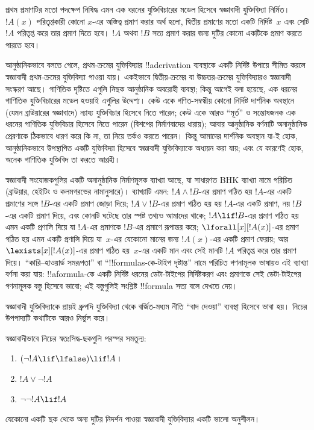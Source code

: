 \documentclass[../../../include/open-logic-section]{subfiles}
\begin{document}
প্রথম প্রমাণটির মতো পদক্ষেপ নিষিদ্ধ এমন এক ধরনের যুক্তিবিচারের মডেল
হিসেবে স্বজ্ঞাবাদী যুক্তিবিদ্যা নির্মিত। $!A(x)$ পরিতৃপ্তকারী কোনো
$x$-এর অস্তিত্ব প্রমাণ করার অর্থ হলো, দ্বিতীয় প্রমাণের মতো একটি
নির্দিষ্ট~$x$ এবং সেটি $!A$ পরিতৃপ্ত করে তার প্রমাণ দিতে হবে। $!A$
অথবা $!B$ সত্য প্রমাণ করার জন্য দুটির কোনো একটিকে প্রমাণ করতে পারতে
হবে।

আনুষ্ঠানিকভাবে বলতে গেলে, প্রথম-ক্রমের যুক্তিবিদ্যার !!a{derivation}
ব্যবস্থাকে একটি নির্দিষ্ট উপায়ে সীমিত করলে স্বজ্ঞাবাদী প্রথম-ক্রমের
যুক্তিবিদ্যা পাওয়া যায়। একইভাবে দ্বিতীয়-ক্রমের বা উচ্চতর-ক্রমের
যুক্তিবিদ্যারও স্বজ্ঞাবাদী সংস্করণ আছে। গাণিতিক দৃষ্টিতে এগুলি নিছক
আনুষ্ঠানিক অবরোহী ব্যবস্থা; কিন্তু আগেই বলা হয়েছে, এক ধরনের গাণিতিক
যুক্তিবিচারের মডেল হওয়াই এগুলির উদ্দেশ্য। কেউ একে গণিত-সম্বন্ধীয়
কোনো নির্দিষ্ট দার্শনিক অবস্থানে (যেমন ব্রাউয়ারের স্বজ্ঞাবাদে) ন্যায্য
যুক্তিবিচার হিসেবে নিতে পারেন; কেউ একে আরও “মূর্ত” ও সন্তোষজনক এক
ধরনের গাণিতিক যুক্তিবিচার হিসেবে নিতে পারেন (বিশপের নির্মাণবাদের
ধারায়); আবার আনুষ্ঠানিক বর্ণনাটি অনানুষ্ঠানিক প্রেরণাকে ঠিকভাবে ধারণ
করে কি না, তা নিয়ে তর্কও করতে পারেন। কিন্তু আমাদের দার্শনিক অবস্থান
যা-ই হোক, আনুষ্ঠানিকভাবে উপস্থাপিত একটি যুক্তিবিদ্যা হিসেবে
স্বজ্ঞাবাদী যুক্তিবিদ্যাকে অধ্যয়ন করা যায়; এবং যে কারণেই হোক, অনেক
গাণিতিক যুক্তিবিদ তা করতে আগ্রহী।

স্বজ্ঞাবাদী সংযোজকগুলির একটি অনানুষ্ঠানিক নির্মাণমূলক ব্যাখ্যা আছে,
যা সাধারণত BHK ব্যাখ্যা নামে পরিচিত (ব্রাউয়ার, হেইটিং ও কলমগরভের
নামানুসারে)। ব্যাখ্যাটি এমন: $!A \land !B$-এর প্রমাণ গঠিত হয় $!A$-এর
একটি প্রমাণের সঙ্গে $!B$-এর একটি প্রমাণ জোড়া দিয়ে; $!A \lor !B$-এর
প্রমাণ গঠিত হয় হয় $!A$-এর একটি প্রমাণ, নয় $!B$-এর একটি প্রমাণ দিয়ে,
এবং কোনটি ঘটেছে তার স্পষ্ট তথ্যও আমাদের থাকে; $!A \lif !B$-এর প্রমাণ
গঠিত হয় এমন একটি প্রণালি দিয়ে যা $!A$-এর প্রমাণকে $!B$-এর প্রমাণে
রূপান্তর করে; $\lforall[x][!A(x)]$-এর প্রমাণ গঠিত হয় এমন একটি প্রণালি
দিয়ে যা~$x$-এর যেকোনো মানের জন্য $!A(x)$-এর একটি প্রমাণ ফেরায়; আর
$\lexists[x][!A(x)]$-এর প্রমাণ গঠিত হয়~$x$-এর একটি মান এবং সেই মানটি
$!A$ পরিতৃপ্ত করে তার প্রমাণ দিয়ে। “কারি--হাওয়ার্ড সমরূপতা” বা
“!!{formula}s-কে-টাইপ দৃষ্টান্ত” নামে পরিচিত গণনামূলক ভাষায়ও এই
ব্যাখ্যা বর্ণনা করা যায়: !!a{formula}-কে একটি নির্দিষ্ট ধরনের
ডেটা-টাইপের নির্দিষ্টকরণ এবং প্রমাণকে সেই ডেটা-টাইপের গণনামূলক বস্তু
হিসেবে ভাবো; এই বস্তুগুলিই সংশ্লিষ্ট !!{formula} সত্য বলে দেখতে দেয়।

স্বজ্ঞাবাদী যুক্তিবিদ্যাকে প্রায়ই ধ্রুপদি যুক্তিবিদ্যা থেকে
বর্জিত-মধ্যম নীতি “বাদ দেওয়া” ব্যবস্থা হিসেবে ভাবা হয়। নিচের
উপপাদ্যটি কথাটিকে আরও নির্ভুল করে।
\begin{thm}
স্বজ্ঞাবাদীভাবে নিচের স্বতঃসিদ্ধ-ছকগুলি পরস্পর সমতুল্য:
\begin{enumerate}
\item $(\lnot !A \lif \lfalse) \lif !A$।
\item $!A \lor \lnot !A$
\item $\lnot \lnot !A \lif !A$
\end{enumerate}
\end{thm}
যেকোনো একটি ছক থেকে অন্য দুটির নিদর্শন পাওয়া স্বজ্ঞাবাদী
যুক্তিবিদ্যার একটি ভালো অনুশীলন।
\end{document}
